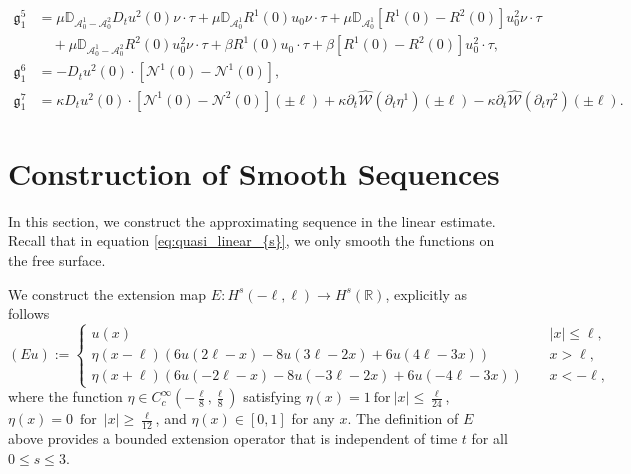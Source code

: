 \documentclass[letterpaper,reqno,10pt,twoside]{amsart}
\makeatletter
\renewcommand \theequation {%
	\ifnum \c@section>\z@ \@arabic\c@section.%
	\fi\@arabic\c@equation} \@addtoreset{equation}{section}
\theoremstyle{definition}
\theoremstyle{remark}
\def\p{\partial}
\makeatother
\begin{document}
\begin{appendix}
\[			\]
			\[
			\begin{aligned}
				\mathfrak{g}^5_1&=\mu\mathbb{D}_{\mathcal{A}_0^1-\mathcal{A}_0^2}D_tu^2(0)\nu\cdot\tau+\mu\mathbb{D}_{\mathcal{A}_0^1}R^1(0)u_0\nu\cdot\tau+\mu\mathbb{D}_{\mathcal{A}_0^1}[R^1(0)-R^2(0)]u^2_0\nu\cdot\tau\\
				&\quad+\mu\mathbb{D}_{\mathcal{A}_0^1-\mathcal{A}_0^2}R^2(0)u_0^2\nu\cdot\tau+\beta R^1(0)u_0\cdot\tau+\beta[R^1(0)-R^2(0)]u^2_0\cdot\tau,\\
				\mathfrak{g}^6_1&=-D_tu^2(0)\cdot[\mathcal{N}^1(0)-\mathcal{N}^1(0)],\\
				\mathfrak{g}^7_1&=\kappa D_tu^2(0)\cdot[\mathcal{N}^1(0)-\mathcal{N}^2(0)](\pm\ell)+\kappa\p_t\hat{\mathscr{W}}(\p_t\eta^1)(\pm\ell)-\kappa\p_t\hat{\mathscr{W}}(\p_t\eta^2)(\pm\ell).
			\end{aligned}
			\]
			
			\makeatletter
			\renewcommand \theequation {%
				C.%
				\@arabic\c@equation} 
			\makeatother
			
			\section{Construction of Smooth Sequences}\label{sec:smooth}
			
			In this section, we construct the approximating sequence in the linear estimate. 
			Recall that in equation \eqref{eq:quasi_linear_{s}}, we only smooth the functions on the free surface.
			
			We construct the extension map
			$
			E: H^s(-\ell,\ell)\to H^{s}(\mathbb{R})$,
			explicitly as follows
			\[
			(Eu):=
			\begin{cases}
				u(x)~~~~~&|x|\leq\ell,\\
				\eta(x-\ell)(6u(2\ell-x)-8u(3\ell-2x)+6u(4\ell-3x))~~~~~~&x>\ell,\\
				\eta(x+\ell)(6u(-2\ell-x)-8u(-3\ell-2x)+6u(-4\ell-3x))~~~~~&x<-\ell,
			\end{cases}
			\]
			where the function $\eta\in C_{c}^{\infty}(-\frac{\ell}{8},\frac{\ell}{8})$ satisfying
			$
			\eta(x)=1\ \text{for}\ |x|\leq \frac{\ell}{24}$,
			$\eta(x)=0~\operatorname{for}~|x|\geq \frac{\ell}{12}$,
			and
			$\eta(x)\in [0,1]$ for any $x$.
			\noindent The definition of $E$ above provides a bounded extension operator that is independent of time $t$ for all $0\le s\le 3$. 
			

\end{appendix}
\end{document}
